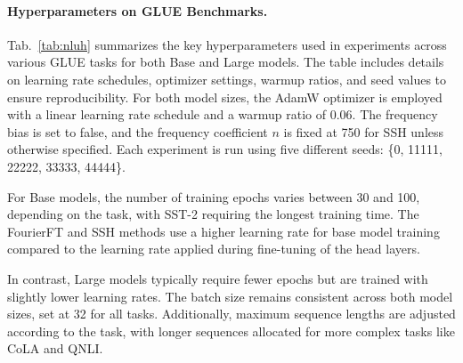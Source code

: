 \paragraph{Hyperparameters on GLUE Benchmarks.} Tab.~\ref{tab:nluh} summarizes the key hyperparameters used in experiments across various GLUE tasks for both Base and Large models. The table includes details on learning rate schedules, optimizer settings, warmup ratios, and seed values to ensure reproducibility. For both model sizes, the AdamW optimizer is employed with a linear learning rate schedule and a warmup ratio of 0.06. The frequency bias is set to false, and the frequency coefficient \( n \) is fixed at 750 for SSH unless otherwise specified. Each experiment is run using five different seeds: \{0, 11111, 22222, 33333, 44444\}.

For Base models, the number of training epochs varies between 30 and 100, depending on the task, with SST-2 requiring the longest training time. The FourierFT and SSH methods use a higher learning rate for base model training compared to the learning rate applied during fine-tuning of the head layers.

In contrast, Large models typically require fewer epochs but are trained with slightly lower learning rates. The batch size remains consistent across both model sizes, set at 32 for all tasks. Additionally, maximum sequence lengths are adjusted according to the task, with longer sequences allocated for more complex tasks like CoLA and QNLI.


\begin{table}
\centering
{}
\caption{\small Hyperparameter settings on E2E benchmark}
\label{tab:nlgh}
\end{table}

